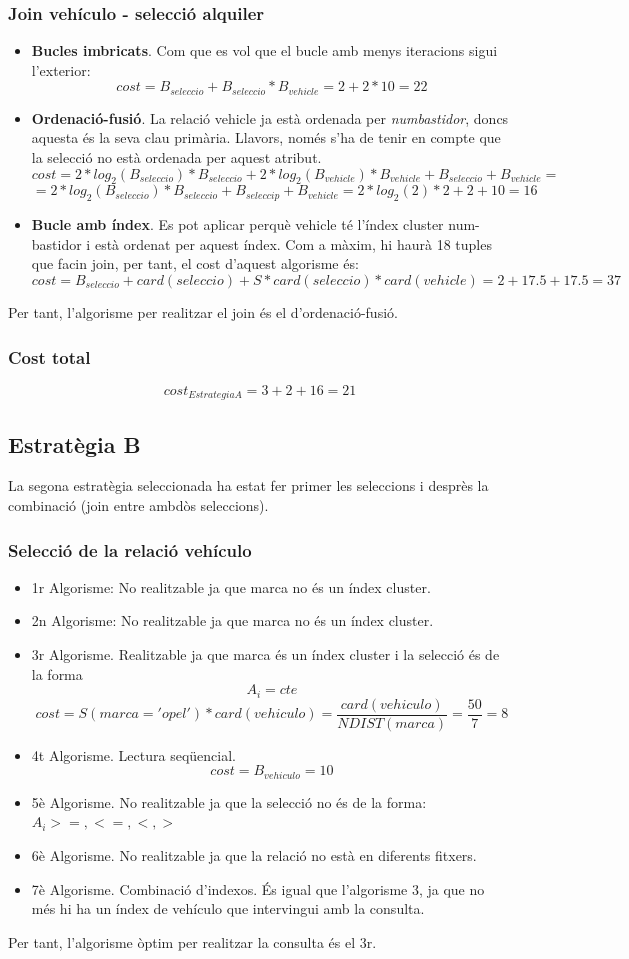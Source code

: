 \documentclass[12pt]{article}
\begin{document}
\subsubsection{Join vehículo - selecció alquiler}
\begin{itemize}
	\item \textbf{Bucles imbricats}. Com que es vol que el bucle amb menys iteracions sigui l’exterior:
	\[cost = B_{seleccio}+ B_{seleccio}*B_{vehicle} =2 + 2 * 10 = 22\]
	\item \textbf{Ordenació-fusió}. La relació vehicle ja està ordenada per \textit{numbastidor}, doncs aquesta és la seva clau primària. Llavors, només s’ha de tenir en compte que la selecció no està ordenada per aquest atribut.
	\[cost =2*log_2(B_{seleccio})*B_{seleccio}+2*log_2(B_{vehicle})*B_{vehicle}+B_{seleccio}+B_{vehicle}=\]
	\[= 2*log_2(B_{seleccio})*B_{seleccio}+B_{seleccip}+B_{vehicle}= 2 *log_2(2)*2+2+10=16\]
\item \textbf{Bucle amb índex}. Es pot aplicar perquè vehicle té l'índex cluster num-bastidor i està ordenat per aquest índex. Com a màxim, hi haurà 18 tuples que facin join, per tant, el cost d’aquest algorisme és: 
\[cost =B_{seleccio}+card(seleccio) +S*card(seleccio)*card(vehicle)= 2+17.5 +17.5 =37\]
\end{itemize}
Per tant, l'algorisme per realitzar el join és el d'ordenació-fusió.
\subsubsection{Cost total}
\[
cost_{Estrategia A}=3+2+16=21\]
\subsection{Estratègia B}
La segona estratègia seleccionada ha estat fer primer les seleccions i desprès la combinació (join entre ambdòs seleccions).
\subsubsection{Selecció de la relació vehículo}
\begin{itemize}
	\item 1r Algorisme: No realitzable ja que marca no és un índex cluster.
	\item 2n Algorisme: No realitzable ja que marca no és un índex cluster.
	\item 3r Algorisme. Realitzable ja que marca és un índex cluster i la selecció és de la forma $$ A_i = cte $$
	\[cost = S(marca = 'opel') * card(vehiculo) = \frac{card(vehiculo)}{NDIST(marca)} = \frac{50}{7} = 8\]
	\item 4t Algorisme. Lectura seqüencial. \[cost = B_{vehiculo} = 10\]
	\item 5è Algorisme. No realitzable ja que la selecció no és de la forma: $ A_i >=, <=, <, > $
	\item 6è Algorisme. No realitzable ja que la relació no està en diferents fitxers.
	\item 7è Algorisme. Combinació d'indexos. És igual que l'algorisme 3, ja que no més hi ha un índex de vehículo que intervingui amb la consulta.
\end{itemize}
Per tant, l'algorisme òptim per realitzar la consulta és el 3r.
\end{document}
